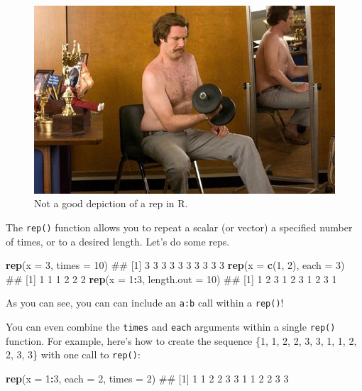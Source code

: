 \documentclass[]{book}
\newenvironment{Shaded}{\begin{snugshade}}{\end{snugshade}}
\newcommand{\KeywordTok}[1]{\textcolor[rgb]{0.13,0.29,0.53}{\textbf{#1}}}
\newcommand{\DataTypeTok}[1]{\textcolor[rgb]{0.13,0.29,0.53}{#1}}
\newcommand{\DecValTok}[1]{\textcolor[rgb]{0.00,0.00,0.81}{#1}}
\newcommand{\OperatorTok}[1]{\textcolor[rgb]{0.81,0.36,0.00}{\textbf{#1}}}
\newcommand{\NormalTok}[1]{#1}
\theoremstyle{definition}
\theoremstyle{definition}
\theoremstyle{remark}
\begin{document}
\begin{figure}

{\centering \includegraphics[width=0.5\linewidth]{images/rep} 

}

\caption{Not a good depiction of a rep in R.}\label{fig:rep}
\end{figure}

The \texttt{rep()} function allows you to repeat a scalar (or vector) a
specified number of times, or to a desired length. Let's do some reps.

\begin{Shaded}
\begin{Highlighting}[]
\KeywordTok{rep}\NormalTok{(}\DataTypeTok{x =} \DecValTok{3}\NormalTok{, }\DataTypeTok{times =} \DecValTok{10}\NormalTok{)}
\NormalTok{##  [1] 3 3 3 3 3 3 3 3 3 3}
\KeywordTok{rep}\NormalTok{(}\DataTypeTok{x =} \KeywordTok{c}\NormalTok{(}\DecValTok{1}\NormalTok{, }\DecValTok{2}\NormalTok{), }\DataTypeTok{each =} \DecValTok{3}\NormalTok{)}
\NormalTok{## [1] 1 1 1 2 2 2}
\KeywordTok{rep}\NormalTok{(}\DataTypeTok{x =} \DecValTok{1}\OperatorTok{:}\DecValTok{3}\NormalTok{, }\DataTypeTok{length.out =} \DecValTok{10}\NormalTok{)}
\NormalTok{##  [1] 1 2 3 1 2 3 1 2 3 1}
\end{Highlighting}
\end{Shaded}

As you can see, you can can include an \texttt{a:b} call within a
\texttt{rep()}!

You can even combine the \texttt{times} and \texttt{each} arguments
within a single \texttt{rep()} function. For example, here's how to
create the sequence \{1, 1, 2, 2, 3, 3, 1, 1, 2, 2, 3, 3\} with one call
to \texttt{rep()}:

\begin{Shaded}
\begin{Highlighting}[]
\KeywordTok{rep}\NormalTok{(}\DataTypeTok{x =} \DecValTok{1}\OperatorTok{:}\DecValTok{3}\NormalTok{, }\DataTypeTok{each =} \DecValTok{2}\NormalTok{, }\DataTypeTok{times =} \DecValTok{2}\NormalTok{)}
\NormalTok{##  [1] 1 1 2 2 3 3 1 1 2 2 3 3}
\end{Highlighting}
\end{Shaded}
\end{document}

